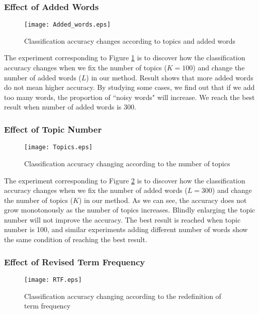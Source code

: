 \documentclass[11pt]{article}
\begin{document}
\subsubsection{Effect of Added Words}

\begin{figure}[htbp] 
\centering\texttt{[image: Added\_words.eps]} 
\caption{Classification accuracy changes according to topics and added words}\label{exp_words}
\end{figure}

The experiment corresponding to Figure \ref{exp_words} is to discover how the classification accuracy changes when we fix the number of topics ($K=100$) and change the number of added words ($L$) in our method. Result shows that more added words do not mean higher accuracy. By studying some cases, we find out that if we add too many words, the proportion of ``noisy words" will increase. We reach the best result when number of added words is 300.

\subsubsection{Effect of Topic Number}

\begin{figure}[htbp] 
\centering\texttt{[image: Topics.eps]} 
\caption{Classification accuracy changing according to the number of topics}\label{exp_topic}
\end{figure}

The experiment corresponding to Figure \ref{exp_topic} is to discover how the classification accuracy changes when we fix the number of added words ($L=300$) and change the number of topics ($K$) in our method. As we can see, the accuracy does not grow monotonously as the number of topics increases. Blindly enlarging the topic number will not improve the accuracy. The best result is reached when topic number is 100, and similar experiments adding different number of words show the same condition of reaching the best result. 

\subsubsection{Effect of Revised Term Frequency}

\begin{figure}[htbp] 
\centering\texttt{[image: RTF.eps]} 
\caption{Classification accuracy changing according to the redefinition of term frequency}\label{exp_RTF}
\end{figure}
\end{document}
